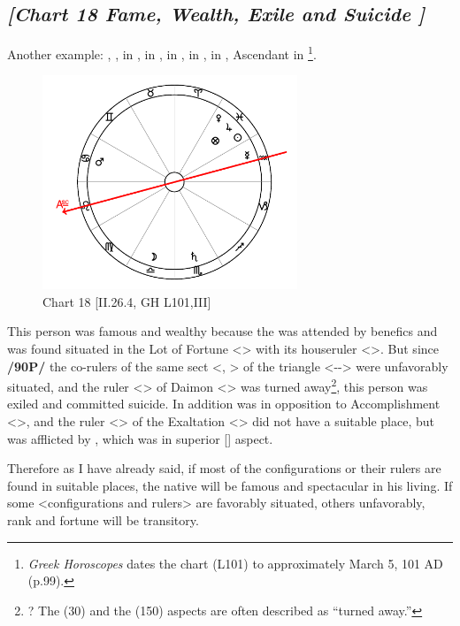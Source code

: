 \newpage
\subsection*{\textit{[Chart 18 Fame, Wealth, Exile and Suicide ]}}

Another example: \Sun, \Jupiter, \Venus\xspace in \Pisces, \Moon\xspace in \Libra, \Mars\xspace in \Cancer, \Mercury\xspace in \Aquarius, \Saturn\xspace in \Scorpio, Ascendant in \Leo
\footnote{\textit{Greek Horoscopes} dates the chart (L101) to approximately March 5, 101 AD (p.99).}.

\clearpage
\begin{figure}
\centering
\vspace{-20pt}
\includegraphics[width=0.68\textwidth]{charts/2_26_4}
\caption{Chart 18 [II.26.4, GH L101,III]}
\label{fig:chart18}
\end{figure}


This person was famous and wealthy because the \Sun\xspace was attended by benefics and was found situated in the Lot of Fortune <\Pisces> with its houseruler <\Jupiter>. But since \textbf{/90P/} the co-rulers of the same sect <\Mars, \Moon> of the triangle <\Pisces-\Cancer-\Scorpio> were
unfavorably situated, and the ruler <\Saturn> of Daimon <\Capricorn> was turned away\footnote{\Saturn\xspace \Semisextile\xspace \Moon? The \Semisextile\xspace (30\deg) and the \Quincunx\xspace (150\deg) aspects are often described as ``turned away.''}, this person was exiled and committed suicide. In addition \Mars\xspace was in opposition to Accomplishment <\Capricorn>, and the ruler <\Mercury> of the Exaltation <\Virgo> did not have a suitable place, but was afflicted by \Saturn, which was in superior [\Square] aspect.

Therefore \mndl as I have already said, if most of the configurations or their rulers are found in suitable places,
the native will be famous and spectacular in his living. If some <configurations and rulers> are favorably
situated, others unfavorably, rank and fortune will be transitory.

\newpage